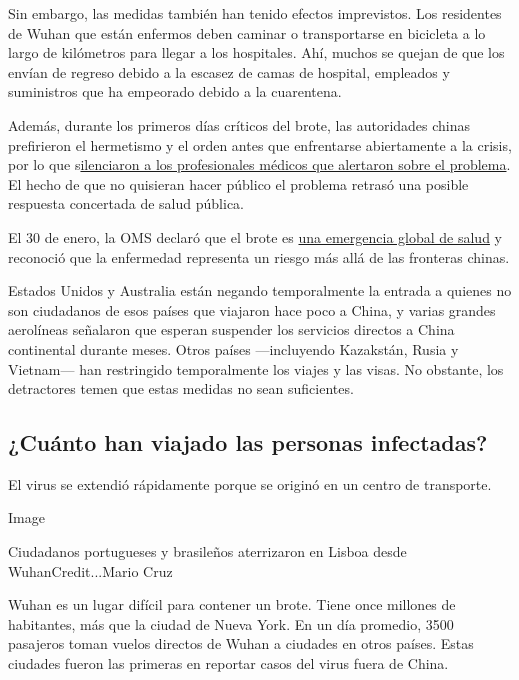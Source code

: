 Sin embargo, las medidas también han tenido efectos imprevistos. Los
residentes de Wuhan que están enfermos deben caminar o transportarse en
bicicleta a lo largo de kilómetros para llegar a los hospitales. Ahí,
muchos se quejan de que los envían de regreso debido a la escasez de
camas de hospital, empleados y suministros que ha empeorado debido a la
cuarentena.

Además, durante los primeros días críticos del brote, las autoridades
chinas prefirieron el hermetismo y el orden antes que enfrentarse
abiertamente a la crisis, por lo que
s\href{https://www.nytimes.com/es/2020/01/24/espanol/mundo/que-es-coronavirus-sintomas.html}{ilenciaron
a los profesionales médicos que alertaron sobre el problema}. El hecho
de que no quisieran hacer público el problema retrasó una posible
respuesta concertada de salud pública.

El 30 de enero, la OMS declaró que el brote es
\href{https://www.nytimes.com/2020/01/30/health/coronavirus-world-health-organization.html}{una
emergencia global de salud} y reconoció que la enfermedad representa un
riesgo más allá de las fronteras chinas.

Estados Unidos y Australia están negando temporalmente la entrada a
quienes no son ciudadanos de esos países que viajaron hace poco a China,
y varias grandes aerolíneas señalaron que esperan suspender los
servicios directos a China continental durante meses. Otros países
---incluyendo Kazakstán, Rusia y Vietnam--- han restringido
temporalmente los viajes y las visas. No obstante, los detractores temen
que estas medidas no sean suficientes.

\hypertarget{cuuxe1nto-han-viajado-las-personas-infectadas}{%
\subsection{¿Cuánto han viajado las personas
infectadas?}\label{cuuxe1nto-han-viajado-las-personas-infectadas}}

El virus se extendió rápidamente porque se originó en un centro de
transporte.

Image

Ciudadanos portugueses y brasileños aterrizaron en Lisboa desde
WuhanCredit...Mario Cruz

Wuhan es un lugar difícil para contener un brote. Tiene once millones de
habitantes, más que la ciudad de Nueva York. En un día promedio, 3500
pasajeros toman vuelos directos de Wuhan a ciudades en otros países.
Estas ciudades fueron las primeras en reportar casos del virus fuera de
China.

